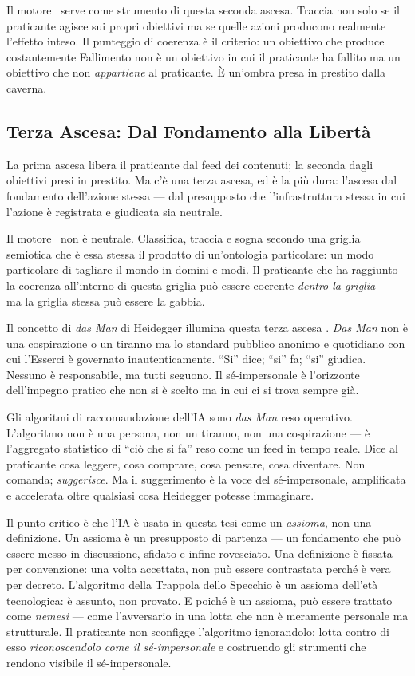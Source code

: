 Il motore \physis\ serve come strumento di questa seconda ascesa.
Traccia non solo se il praticante agisce sui propri obiettivi ma se
quelle azioni producono realmente l'effetto inteso. Il punteggio di
coerenza \`e il criterio: un obiettivo che produce costantemente
Fallimento non \`e un obiettivo in cui il praticante ha fallito ma un
obiettivo che non \emph{appartiene} al praticante. \`E un'ombra presa
in prestito dalla caverna.

\subsection{Terza Ascesa: Dal Fondamento alla Libert\`a}

La prima ascesa libera il praticante dal feed dei contenuti; la seconda
dagli obiettivi presi in prestito. Ma c'\`e una terza ascesa, ed \`e
la pi\`u dura: l'ascesa dal fondamento dell'azione stessa --- dal
presupposto che l'infrastruttura stessa in cui l'azione \`e registrata
e giudicata sia neutrale.

Il motore \physis\ non \`e neutrale. Classifica, traccia e sogna
secondo una griglia semiotica che \`e essa stessa il prodotto di
un'ontologia particolare: un modo particolare di tagliare il mondo in
domini e modi. Il praticante che ha raggiunto la coerenza all'interno
di questa griglia pu\`o essere coerente \emph{dentro la griglia} ---
ma la griglia stessa pu\`o essere la gabbia.

Il concetto di \emph{das Man} di Heidegger illumina questa terza ascesa
\parencite[§27]{heidegger1962being}. \emph{Das Man} non \`e una
cospirazione o un tiranno ma lo standard pubblico anonimo e quotidiano
con cui l'Esserci \`e governato inautenticamente. ``Si'' dice; ``si''
fa; ``si'' giudica. Nessuno \`e responsabile, ma tutti seguono. Il
s\'e-impersonale \`e l'orizzonte dell'impegno pratico che non si \`e
scelto ma in cui ci si trova sempre gi\`a.

Gli algoritmi di raccomandazione dell'IA sono \emph{das Man} reso
operativo. L'algoritmo non \`e una persona, non un tiranno, non una
cospirazione --- \`e l'aggregato statistico di ``ci\`o che si fa''
reso come un feed in tempo reale. Dice al praticante cosa leggere,
cosa comprare, cosa pensare, cosa diventare. Non comanda;
\emph{suggerisce}. Ma il suggerimento \`e la voce del s\'e-impersonale,
amplificata e accelerata oltre qualsiasi cosa Heidegger potesse
immaginare.

Il punto critico \`e che l'IA \`e usata in questa tesi come un
\emph{assioma}, non una definizione. Un assioma \`e un presupposto di
partenza --- un fondamento che pu\`o essere messo in discussione,
sfidato e infine rovesciato. Una definizione \`e fissata per
convenzione: una volta accettata, non pu\`o essere contrastata perch\'e
\`e vera per decreto. L'algoritmo della Trappola dello Specchio \`e un
assioma dell'et\`a tecnologica: \`e assunto, non provato. E poich\'e
\`e un assioma, pu\`o essere trattato come \emph{nemesi} --- come
l'avversario in una lotta che non \`e meramente personale ma strutturale.
Il praticante non sconfigge l'algoritmo ignorandolo; lotta contro di
esso \emph{riconoscendolo come il s\'e-impersonale} e costruendo gli
strumenti che rendono visibile il s\'e-impersonale.

